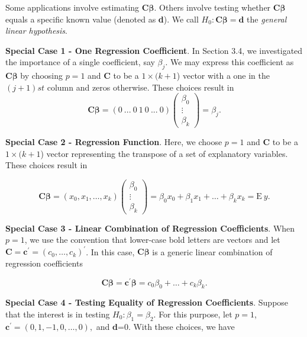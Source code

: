 Some applications involve estimating $\mathbf{C} \boldsymbol \beta$.
Others involve testing whether $\mathbf{C} \boldsymbol \beta$ equals
a specific known value (denoted as \textbf{d}). We call
$H_0:\mathbf{C \boldsymbol \beta =d}$ the \emph{general linear
hypothesis}.

\textbf{Special Case 1 - One Regression Coefficient}. In Section
3.4, we investigated the importance of a single coefficient, say
$\beta_j.$ We may express this coefficient as $\mathbf{C}
\boldsymbol \beta$ by choosing $p=1$ and \textbf{C} to be a $1\times
(k+1$) vector with a one in the $(j+1)st$ column and zeros
otherwise. These choices result in
\begin{equation*}
\mathbf{C \boldsymbol \beta =}\left( 0~...~0~1~0~...~0\right) \left(
\begin{array}{c}
\beta_0 \\
\vdots  \\
\beta_k%
\end{array}
\right) =\beta_j.
\end{equation*}

\textbf{Special Case 2 - Regression Function}. Here, we choose $p=1$
and \textbf{C} to be a $1\times (k+1$) vector representing the
transpose of a set of explanatory variables. These choices result in

\begin{equation*}
\mathbf{C \boldsymbol \beta =}\left(x_0,x_1, \ldots, x_k \right)
\left(
\begin{array}{c}
\beta_0 \\
\vdots  \\
\beta_k
\end{array}
\right) = \beta_0 x_0 + \beta_1 x_1 +\ldots + \beta_k x_k =
\mathrm{E} ~y.
\end{equation*}


\textbf{Special Case 3 - Linear Combination of Regression
Coefficients}. When $p=1$, we use the convention that lower-case
bold letters are vectors and let $\mathbf{C = c^{\prime}}=
\left(c_0, \ldots, c_k \right)^{\prime}$. In this case, $\mathbf{C}
\boldsymbol \beta$ is a generic linear combination of regression
coefficients

\begin{equation*}
\mathbf{C} \boldsymbol \beta =\mathbf{c}^{\prime} \boldsymbol \beta
= c_0 \beta_0 + \ldots + c_k \beta_k.
\end{equation*}

\bigskip

\textbf{Special Case 4 - Testing Equality of Regression
Coefficients}. Suppose that the interest is in testing $H_0: \beta_1
= \beta_2.$ For this purpose, let $p=1$, $\mathbf{c}^{\prime}=
\left(0,1, -1, 0, \ldots, 0\right),$ and \textbf{d}=0. With these
choices, we have

